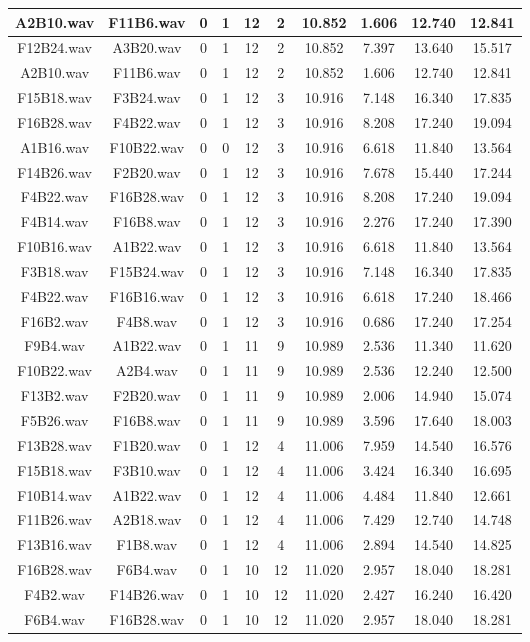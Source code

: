 \documentclass[11pt,a4paper]{book}
\begin{document}
\begin{longtable}[c]{|c|c|c|c|c|c|c|c|c|c|}
A2B10.wav&F11B6.wav&0&1&12&2&10.852&1.606&12.740&12.841\\ \hline
F12B24.wav&A3B20.wav&0&1&12&2&10.852&7.397&13.640&15.517\\ \hline
A2B10.wav&F11B6.wav&0&1&12&2&10.852&1.606&12.740&12.841\\ \hline
F15B18.wav&F3B24.wav&0&1&12&3&10.916&7.148&16.340&17.835\\ \hline
F16B28.wav&F4B22.wav&0&1&12&3&10.916&8.208&17.240&19.094\\ \hline
A1B16.wav&F10B22.wav&0&0&12&3&10.916&6.618&11.840&13.564\\ \hline
F14B26.wav&F2B20.wav&0&1&12&3&10.916&7.678&15.440&17.244\\ \hline
F4B22.wav&F16B28.wav&0&1&12&3&10.916&8.208&17.240&19.094\\ \hline
F4B14.wav&F16B8.wav&0&1&12&3&10.916&2.276&17.240&17.390\\ \hline
F10B16.wav&A1B22.wav&0&1&12&3&10.916&6.618&11.840&13.564\\ \hline
F3B18.wav&F15B24.wav&0&1&12&3&10.916&7.148&16.340&17.835\\ \hline
F4B22.wav&F16B16.wav&0&1&12&3&10.916&6.618&17.240&18.466\\ \hline
F16B2.wav&F4B8.wav&0&1&12&3&10.916&0.686&17.240&17.254\\ \hline
F9B4.wav&A1B22.wav&0&1&11&9&10.989&2.536&11.340&11.620\\ \hline
F10B22.wav&A2B4.wav&0&1&11&9&10.989&2.536&12.240&12.500\\ \hline
F13B2.wav&F2B20.wav&0&1&11&9&10.989&2.006&14.940&15.074\\ \hline
F5B26.wav&F16B8.wav&0&1&11&9&10.989&3.596&17.640&18.003\\ \hline
F13B28.wav&F1B20.wav&0&1&12&4&11.006&7.959&14.540&16.576\\ \hline
F15B18.wav&F3B10.wav&0&1&12&4&11.006&3.424&16.340&16.695\\ \hline
F10B14.wav&A1B22.wav&0&1&12&4&11.006&4.484&11.840&12.661\\ \hline
F11B26.wav&A2B18.wav&0&1&12&4&11.006&7.429&12.740&14.748\\ \hline
F13B16.wav&F1B8.wav&0&1&12&4&11.006&2.894&14.540&14.825\\ \hline
F16B28.wav&F6B4.wav&0&1&10&12&11.020&2.957&18.040&18.281\\ \hline
F4B2.wav&F14B26.wav&0&1&10&12&11.020&2.427&16.240&16.420\\ \hline
F6B4.wav&F16B28.wav&0&1&10&12&11.020&2.957&18.040&18.281\\ \hline

\end{longtable}
\end{document}
